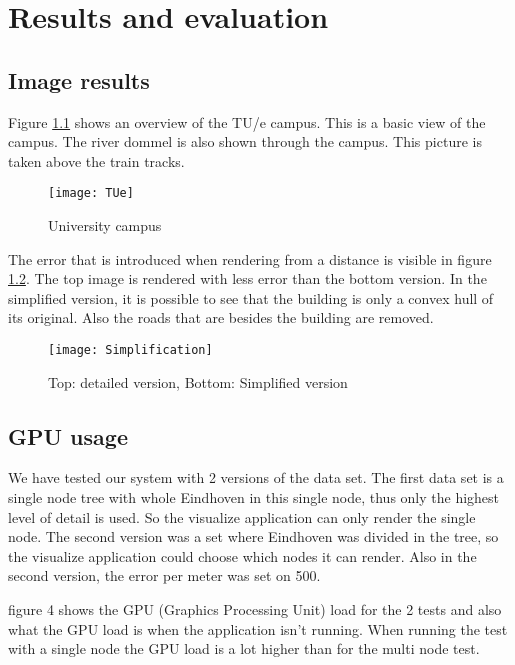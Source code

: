 \chapter{Results and evaluation}
\label{chap:ResultsAndEvaluation}
\section{Image results}
\label{sec:ImageResults}
Figure \ref{fig:UniversityCampus} shows an overview of the TU/e campus. This is a basic view of the campus. The river dommel is also shown through the campus. This picture is taken above the train tracks.

\begin{figure}[htb!]
\centering
\texttt{[image: TUe]}
\caption{University campus}
\label{fig:UniversityCampus}
\end{figure} 

The error that is introduced when rendering from a distance is visible in figure \ref{fig:Simplification}. The top image is rendered with less error than the bottom version. In the simplified version, it is possible to see that the building is only a convex hull of its original. Also the roads that are besides the building are removed.

\begin{figure}[htb!]
\centering
\texttt{[image: Simplification]}
\caption{Top: detailed version, Bottom: Simplified version}
\label{fig:Simplification}
\end{figure}

\section{GPU usage}
\label{sec:GPUUsage}
We have tested our system with 2 versions of the data set. The first data set is a single node tree with whole Eindhoven in this single node, thus only the highest level of detail is used. So the visualize application can only render the single node. The second version was a set where Eindhoven was divided in the tree, so the visualize application could choose which nodes it can render. Also in the second version, the error per meter was set on 500.

figure 4 shows the GPU (Graphics Processing Unit) load for the 2 tests and also what the GPU load is when the application isn’t running. When running the test with a single node the GPU load is a lot higher than for the multi node test.

